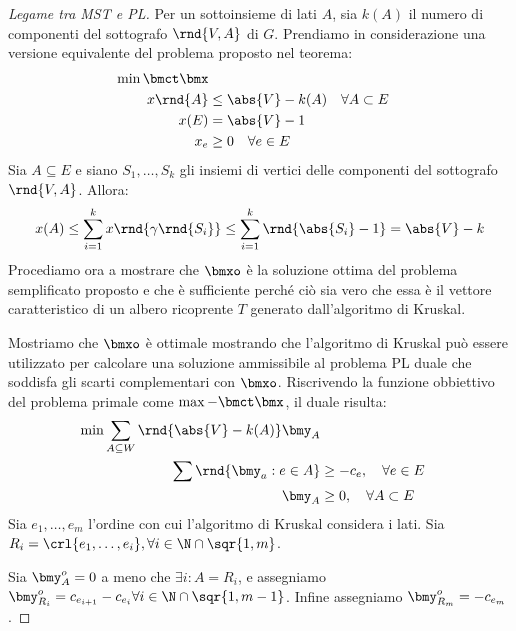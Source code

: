 \documentclass[\main/main.tex]{subfiles}
\begin{document}
\begin{proof}[Legame tra MST e PL]
  Per un sottoinsieme di lati \(A\), sia \(k(A)\) il numero di componenti del sottografo \(\rnd{V, A}\) di \(G\). Prendiamo in considerazione una versione equivalente del problema proposto nel teorema:
  \begin{align*}
    \min \bmct\bmx                                           \\
    x\rnd{A} & \leq \abs{V} - k(A) \quad \forall A \subset E \\
    x(E)     & = \abs{V} -1                                  \\
    x_e      & \geq 0 \quad \forall e \in E
  \end{align*}
  Sia \(A \subseteq E\) e siano \(S_1, \ldots, S_k\) gli insiemi di vertici delle componenti del sottografo \(\rnd{V, A}\). Allora:
  \[
    x(A) \leq \sum_{i=1}^k x\rnd{\gamma\rnd{S_i}} \leq \sum_{i=1}^k \rnd{\abs{S_i}-1} = \abs{V} - k
  \]
  Procediamo ora a mostrare che \(\bmxo\) è la soluzione ottima del problema semplificato proposto e che è sufficiente perché ciò sia vero che essa è il vettore caratteristico di un albero ricoprente \(T\) generato dall'algoritmo di Kruskal.

  Mostriamo che \(\bmxo\) è ottimale mostrando che l'algoritmo di Kruskal può essere utilizzato per calcolare una soluzione ammissibile al problema PL duale che soddisfa gli scarti complementari con \(\bmxo\). Riscrivendo la funzione obbiettivo del problema primale come \(\max -\bmct\bmx \), il duale risulta:
  \begin{align*}
    \min \sum_{A \subseteq W} \rnd{\abs{V} - k(A)}\bmy_A           \\
    \sum \rnd{\bmy_a: e \in A} & \geq -c_e, \quad \forall e \in E  \\
    \bmy_A                     & \geq 0, \quad \forall A \subset E
  \end{align*}
  Sia \(e_1, \ldots, e_m\) l'ordine con cui l'algoritmo di Kruskal considera i lati. Sia \(R_i = \crl{e_1, \ldots, e_i}, \forall i \in \N \cap \sqr{1, m}\).

  Sia \(\bmy_A^o=0\) a meno che \(\exists i: A = R_i\), e assegniamo \(\bmy^o_{R_i} = c_{e_{i+1}} - c_{e_{i}} \forall i \in \N \cap \sqr{1, m-1}\). Infine assegniamo \(\bmy^o_{R_m} = -c_{e_m}\).


\end{proof}
\end{document}
